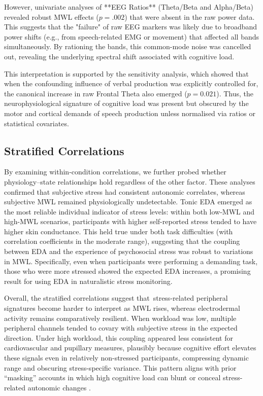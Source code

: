 \documentclass[lettersize,journal]{IEEEtran}
\begin{document}
However, univariate analyses of **EEG Ratios** (Theta/Beta and Alpha/Beta) revealed robust MWL effects ($p=.002$) that were absent in the raw power data. This suggests that the "failure" of raw EEG markers was likely due to broadband power shifts (e.g., from speech-related EMG or movement) that affected all bands simultaneously. By rationing the bands, this common-mode noise was cancelled out, revealing the underlying spectral shift associated with cognitive load.

This interpretation is supported by the sensitivity analysis, which showed that when the confounding influence of verbal production was explicitly controlled for, the canonical increase in raw Frontal Theta also emerged ($p=0.021$). Thus, the neurophysiological signature of cognitive load was present but obscured by the motor and cortical demands of speech production unless normalised via ratios or statistical covariates.

\subsection{Stratified Correlations}

By examining within-condition correlations, we further probed whether physiology–state relationships hold regardless of the other factor. These analyses confirmed that subjective stress had consistent autonomic correlates, whereas subjective MWL remained physiologically undetectable. Tonic EDA emerged as the most reliable individual indicator of stress levels: within both low-MWL and high-MWL scenarios, participants with higher self-reported stress tended to have higher skin conductance. This held true under both task difficulties (with correlation coefficients in the moderate range), suggesting that the coupling between EDA and the experience of psychosocial stress was robust to variations in MWL. Specifically, even when participants were performing a demanding task, those who were more stressed showed the expected EDA increases, a promising result for using EDA in naturalistic stress monitoring.

Overall, the stratified correlations suggest that \,stress-related peripheral signatures become harder to interpret as MWL rises, whereas electrodermal activity remains comparatively resilient. When workload was low, multiple peripheral channels tended to covary with subjective stress in the expected direction. Under high workload, this coupling appeared less consistent for cardiovascular and pupillary measures, plausibly because cognitive effort elevates these signals even in relatively non-stressed participants, compressing dynamic range and obscuring stress-specific variance. This pattern aligns with prior ``masking'' accounts in which high cognitive load can blunt or conceal stress-related autonomic changes \cite{conwayEffectStressCognitive2013, setzDiscriminatingStressCognitive2010}.
\end{document}
